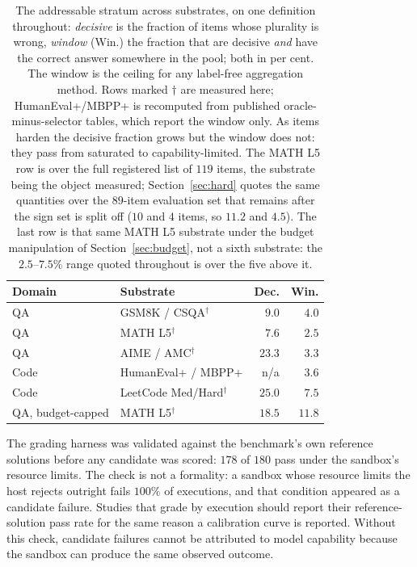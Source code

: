 \documentclass{article}
\begin{document}
\begin{table}[t]
\caption{The addressable stratum across substrates, on one definition
throughout: \emph{decisive} is the fraction of items whose plurality is wrong,
\emph{window} (Win.) the fraction that are decisive \emph{and} have the
correct answer somewhere in the pool; both in per cent. The window is the ceiling for any label-free
aggregation method. Rows marked $\dagger$ are measured here; HumanEval+/MBPP+
is recomputed from published oracle-minus-selector tables, which report the
window only. As items harden the decisive fraction grows but the window does
not: they pass from saturated to capability-limited. The MATH L5 row is over
the full registered list of $119$ items, the substrate being the object
measured; Section~\ref{sec:hard} quotes the same quantities over the $89$-item
evaluation set that remains after the sign set is split off ($10$ and $4$
items, so $11.2$ and $4.5$). The last row is that same MATH L5 substrate
under the budget manipulation of Section~\ref{sec:budget}, not a sixth
substrate: the $2.5$--$7.5\%$ range quoted throughout is over the five
above it.}
\label{tab:window}
\centering\footnotesize
\setlength{\tabcolsep}{4pt}
\setlength{\tabcolsep}{3pt}
\begin{tabular}{@{}l l r r@{}}
\toprule
Domain & Substrate & Dec. & Win. \\
\midrule
QA & GSM8K / CSQA$^\dagger$ & $9.0$ & $4.0$ \\
QA & MATH L5$^\dagger$ & $7.6$ & $2.5$ \\
QA & AIME / AMC$^\dagger$ & $23.3$ & $3.3$ \\
Code & HumanEval+ / MBPP+ & n/a & $3.6$ \\
Code & LeetCode Med/Hard$^\dagger$ & $25.0$ & $7.5$ \\
QA, budget-capped & MATH L5$^\dagger$ & $18.5$ & $11.8$ \\
\bottomrule
\end{tabular}
\end{table}

The grading harness was validated against the benchmark's own
reference solutions before any candidate was scored: $178$ of $180$ pass
under the sandbox's resource limits. The check is not a formality: a sandbox whose
resource limits the host rejects outright fails $100\%$ of executions, and
that condition appeared as a candidate failure. Studies that grade by execution should report their
reference-solution pass rate for the same reason a calibration curve is
reported. Without this check, candidate failures cannot be attributed to model
capability because the sandbox can produce the same observed outcome.
\end{document}
